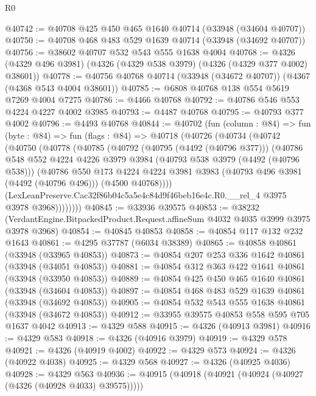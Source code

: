 \begin{lexlean}{R0}
\begin{coremodule}
@40742 := @40708 @425 @450 @465 @1640 @40714 (@33948 (@34604 @40707))
@40750 := @40708 @468 @483 @529 @1639 @40714 (@33948 (@34692 @40707))
@40756 := @38602 @40707 @532 @543 @555 @1638 @4004
@40768 := @4326 (@4329 @496 @3981) (@4326 (@4329 @538 @3979) (@4326 (@4329 @377 @4002) @38601))
@40778 := @40756 @40768 @40714 (@33948 (@34672 @40707)) (@4367 (@4368 @543 @4004 @38601))
@40785 := @6808 @40768 @138 @554 @5619 @7269 @4004 @7275
@40786 := @4466 @40768
@40792 := @40786 @546 @553 @4224 @4227 @4002 @3985
@40793 := @4487 @40768
@40795 := @40793 @377 @4002
@40796 := @4493 @40768
@40844 := @40702
    (fun (column : @84) =>
    fun (byte : @84) =>
    fun (flags : @84) =>
    @40718
      (@40726
        (@40734
          (@40742
            (@40750
              (@40778
                (@40785
                  (@40792
                    (@40795 (@4492 (@40796 @377)))
                    (@40786
                      @548
                      @552
                      @4224
                      @4226
                      @3979
                      @3984
                      (@40793 @538 @3979 (@4492 (@40796 @538)))
                      (@40786
                        @550
                        @173
                        @4224
                        @4224
                        @3981
                        @3983
                        (@40793 @496 @3981 (@4492 (@40796 @496)))
                        (@4500 @40768))))
                  (LexLeanPreserve.Cac32f86b04c5a5e4c84d9f46beb16e4c.R0.__rel_4
                    @3975
                    @3978
                    @3968))))))))
@40845 := @33936 @39575
@40853 := @38232
    (VerdantEngine.BitpackedProduct.Request.affineSum @4032 @4035 @3999 @3975 @3978 @3968)
@40854 := @40845 @40853
@40858 := @40854 @117 @132 @232 @1643
@40861 := @4295 @37787 (@6034 @38389)
@40865 := @40858 @40861 (@33948 (@33965 @40853))
@40873 := @40854 @207 @253 @336 @1642 @40861 (@33948 (@34051 @40853))
@40881 := @40854 @312 @363 @422 @1641 @40861 (@33948 (@33950 @40853))
@40889 := @40854 @425 @450 @465 @1640 @40861 (@33948 (@34604 @40853))
@40897 := @40854 @468 @483 @529 @1639 @40861 (@33948 (@34692 @40853))
@40905 := @40854 @532 @543 @555 @1638 @40861 (@33948 (@34672 @40853))
@40912 := @33955 @39575 @40853 @558 @595 @705 @1637 @4042
@40913 := @4329 @588
@40915 := @4326 (@40913 @3981)
@40916 := @4329 @583
@40918 := @4326 (@40916 @3979)
@40919 := @4329 @578
@40921 := @4326 (@40919 @4002)
@40922 := @4329 @573
@40924 := @4326 (@40922 @4038)
@40925 := @4329 @568
@40927 := @4326 (@40925 @4036)
@40928 := @4329 @563
@40936 := @40915 (@40918 (@40921 (@40924 (@40927 (@4326 (@40928 @4033) @39575)))))

\end{coremodule}
\end{lexlean}
